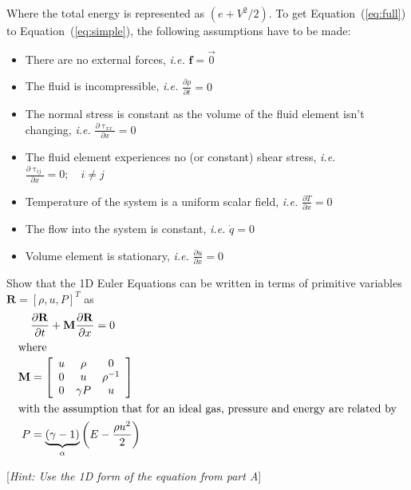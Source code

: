\documentclass[addpoints]{exam}
\begin{document}
\begin{questions}
\begin{solution}
Where the total energy is represented as $(e+V^{2}/2)$. To get Equation~(\ref{eq:full}) to Equation~(\ref{eq:simple}), the following assumptions have to be made:

\begin{itemize}
\item There are no external forces, {\em i.e.} $\bm{f}=\vec{0}$
\item The fluid is incompressible, {\em i.e.} $\frac{\partial \rho}{\partial t} = 0$
\item The normal stress is constant as the volume of the fluid element isn't changing, {\em i.e.} $\frac{\partial \uptau_{xx}}{\partial x}=0$
\item The fluid element experiences no (or constant) shear stress, {\em i.e.} $\frac{\partial \uptau_{ij}}{\partial x} = 0;\quad i\neq j$
\item Temperature of the system is a uniform scalar field, {\em i.e.} $\frac{\partial T}{\partial x}=0$
\item The flow into the system is constant, {\em i.e.} $\dot{q}=0$
\item Volume element is stationary, {\em i.e.} $\frac{\partial u}{\partial x} = 0$
\end{itemize}
\end{solution}
\newpage

Show that the 1D Euler Equations can be written in terms of primitive variables $\mathbf{R}=[\rho, u, P]^{T}$ as
\begin{align}
&\frac{\partial \mathbf{R}}{\partial t}+\mathbf{M}\frac{\partial \mathbf{R}}{\partial x} = 0\label{eq:1d_form}\\
\intertext{where}
\mathbf{M} &= \left[ \begin{array}{c c c}u & \rho & 0\\ 0 & u & \rho^{-1} \\ 0 & \gamma P & u\end{array} \right]\label{eq:m_def}\\
\intertext{with the assumption that for an ideal gas, pressure and energy are related by}
P &= \underbrace{(\gamma - 1)}_{\alpha}\left(E-\frac{\rho u^{2}}{2}\right)\label{eq:p_def}
\end{align}

[{\em Hint: Use the 1D form of the equation from part A}]


\end{questions}
\end{document}
